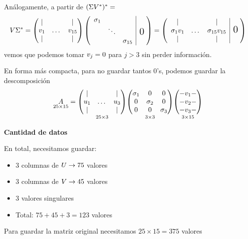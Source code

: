 \begin{ejemplo}
Análogamente, a partir de $(\Sigmab \Vb^*)^* = $
$$
\Vb \Sigmab^* = \begin{pmatrix}  \vert & & \vert \\ \vb_1 & \dots & \vb_{15} \\ \vert & & \vert \end{pmatrix}
\begin{pmatrix} \begin{array}{ccc|c@{\mskip5mu}}\sigma_1 & & \\ & \ddots & & \text{\Large 0}           \\ & & \sigma_{15}\end{array}\\      \end{pmatrix} = \begin{pmatrix}
\begin{array}{ccc|c@{\mskip5mu}}\vert & & \vert \\ \sigma_1 \vb_1 & \dots & \sigma_{15} \vb_{15} & \text{\Large 0}           \\ \vert & & \vert \end{array}\\
 \end{pmatrix}
$$
vemos que podemos tomar $\vb_j = \cero$ para $j > 3$ sin perder información.

En forma más compacta, para no guardar tantos 0's, podemos guardar la descomposición
$$
\underset{25 \times 15}\Ab = \underset{25 \times 3}{\begin{pmatrix}  \vert & & \vert \\ \ub_1 & \dots & \ub_{3} \\ \vert & & \vert \end{pmatrix}}
\underset{3 \times 3}{\begin{pmatrix}  \sigma_1 & 0 & 0 \\
0 & \sigma_2 & 0 \\
0 & 0 & \sigma_3  \end{pmatrix}}
\underset{3 \times 15}{\begin{pmatrix}
- \vb_1 - \\
- \vb_2 - \\
- \vb_3 - \\
\end{pmatrix}}
$$

\textbf{Cantidad de datos}

En total, necesitamos guardar:
\begin{itemize}
\item 3 columnas de $\Ub \rightarrow 75$ valores
\item 3 columnas de $\Vb \rightarrow 45$ valores
\item 3 valores singulares
\item Total: $75 + 45 + 3 = 123$ valores
\end{itemize}

Para guardar la matriz original necesitamos $25 \times 15 = 375$ valores

\end{ejemplo}

